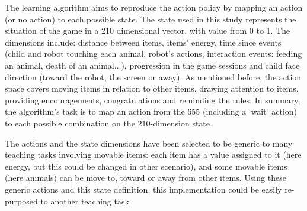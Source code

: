 The learning algorithm aims to reproduce the action policy by mapping an action (or no action) to each possible state. The state used in this study represents the situation of the game in a 210 dimensional vector, with value from 0 to 1. The dimensions include: distance between items, items' energy, time since events (child and robot touching each animal, robot's actions, interaction events: feeding an animal, death of an animal...), progression in the game sessions and child face direction (toward the robot, the screen or away). As mentioned before, the action space covers moving items in relation to other items, drawing attention to items, providing encouragements, congratulations and reminding the rules. In summary, the algorithm's task is to map an action from the 655 (including a `wait' action) to each possible combination on the 210-dimension state.

The actions and the state dimensions have been selected to be generic to many teaching tasks involving movable items: each item has a value assigned to it (here energy, but this could be changed in other scenario), and some movable items (here animals) can be move to, toward or away from other items. Using these generic actions and this state definition, this implementation could be easily re-purposed to another teaching task.

